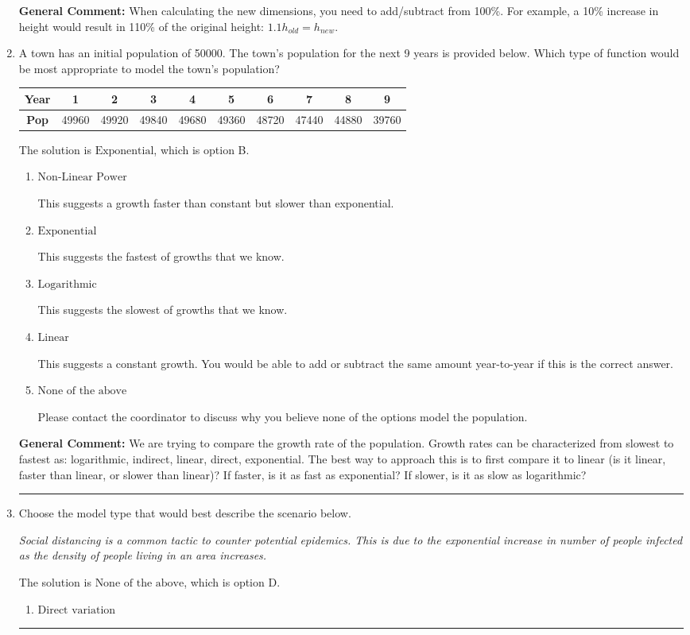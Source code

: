 \documentclass{extbook}[14pt]
\newcommand{\litem}[1]{\item #1

\rule{\textwidth}{0.4pt}}
\begin{document}
\begin{enumerate}
{\textbf{General Comment:} When calculating the new dimensions, you need to add/subtract from 100\%. For example, a 10\% increase in height would result in 110\% of the original height: $1.1h_{old} = h_{new}$.
}
\litem{
A town has an initial population of 50000. The town's population for the next 9 years is provided below. Which type of function would be most appropriate to model the town's population?


\begin{tabular}{c|c|c|c|c|c|c|c|c|c}
\textbf{Year} &1 &2 &3 &4 &5 &6 &7 &8 &9\tabularnewline \hline
\textbf{Pop} &49960 &49920 &49840 &49680 &49360 &48720 &47440 &44880 &39760\end{tabular}The solution is \( \text{Exponential} \), which is option B.\begin{enumerate}[label=\Alph*.]
\item \( \text{Non-Linear Power} \)

This suggests a growth faster than constant but slower than exponential.
\item \( \text{Exponential} \)

This suggests the fastest of growths that we know.
\item \( \text{Logarithmic} \)

This suggests the slowest of growths that we know.
\item \( \text{Linear} \)

This suggests a constant growth. You would be able to add or subtract the same amount year-to-year if this is the correct answer.
\item \( \text{None of the above} \)

Please contact the coordinator to discuss why you believe none of the options model the population.
\end{enumerate}

\textbf{General Comment:} We are trying to compare the growth rate of the population. Growth rates can be characterized from slowest to fastest as: logarithmic, indirect, linear, direct, exponential. The best way to approach this is to first compare it to linear (is it linear, faster than linear, or slower than linear)? If faster, is it as fast as exponential? If slower, is it as slow as logarithmic?
}
\litem{
Choose the model type that would best describe the scenario below.

\begin{center}
    \textit{ Social distancing is a common tactic to counter potential epidemics. This is due to the exponential increase in number of people infected as the density of people living in an area increases. }
\end{center}
The solution is \( \text{None of the above} \), which is option D.\begin{enumerate}[label=\Alph*.]
\item \( \text{Direct variation} \)



\end{enumerate}}
\end{enumerate}
\end{document}
